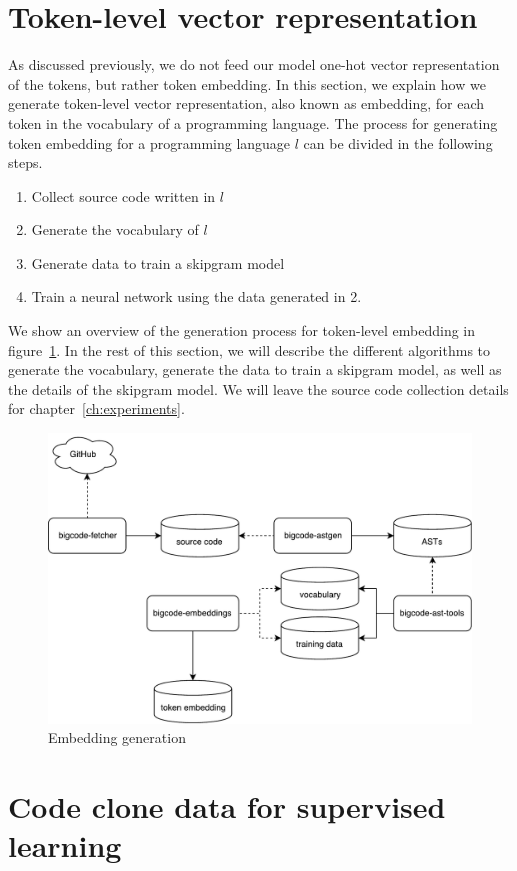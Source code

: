 \section{\label{sec:token-representation}Token-level vector representation}
As discussed previously, we do not feed our model one-hot vector representation
of the tokens, but rather token embedding. In this section, we explain how we
generate token-level vector representation, also known as embedding, for each
token in the vocabulary of a programming language. The process for generating
token embedding for a programming language $l$ can be divided in the following
steps.
\begin{enumerate}
\item Collect source code written in $l$
\item Generate the vocabulary of $l$
\item Generate data to train a skipgram model
\item Train a neural network using the data generated in 2.
\end{enumerate}
We show an overview of the generation process for token-level embedding in
figure~\ref{fig:embedding-generation}. In the rest of this section, we will
describe the different algorithms to generate the vocabulary, generate the data
to train a skipgram model, as well as the details of the skipgram model. We will
leave the source code collection details for chapter~\ref{ch:experiments}.

\begin{figure}
  \centering\includegraphics[width=14cm]{images/embedding-generation.pdf}
  \caption{\label{fig:embedding-generation} Embedding generation}
\end{figure}
%
\section{\label{sec:code-clone-data}Code clone data for supervised learning}
